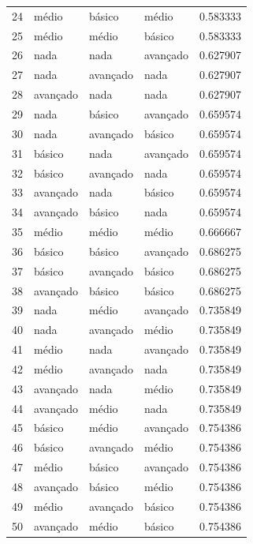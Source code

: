 \documentclass[]{article}
\begin{document}
\begin{longtable}{|llll|r|}
		24 & médio    & básico   & médio    & 0.583333     \\
		25 & médio    & médio    & básico   & 0.583333     \\
		26 & nada      & nada      & avançado & 0.627907     \\
		27 & nada      & avançado & nada      & 0.627907     \\
		28 & avançado & nada      & nada      & 0.627907     \\
		29 & nada      & básico   & avançado & 0.659574     \\
		30 & nada      & avançado & básico   & 0.659574     \\
		31 & básico   & nada      & avançado & 0.659574     \\
		32 & básico   & avançado & nada      & 0.659574     \\
		33 & avançado & nada      & básico   & 0.659574     \\
		34 & avançado & básico   & nada      & 0.659574     \\
		35 & médio    & médio    & médio    & 0.666667     \\
		36 & básico   & básico   & avançado & 0.686275     \\
		37 & básico   & avançado & básico   & 0.686275     \\
		38 & avançado & básico   & básico   & 0.686275     \\
		39 & nada      & médio    & avançado & 0.735849     \\
		40 & nada      & avançado & médio    & 0.735849     \\
		41 & médio    & nada      & avançado & 0.735849     \\
		42 & médio    & avançado & nada      & 0.735849     \\
		43 & avançado & nada      & médio    & 0.735849     \\
		44 & avançado & médio    & nada      & 0.735849     \\
		45 & básico   & médio    & avançado & 0.754386     \\
		46 & básico   & avançado & médio    & 0.754386     \\
		47 & médio    & básico   & avançado & 0.754386     \\
		48 & avançado & básico   & médio    & 0.754386     \\
		49 & médio    & avançado & básico   & 0.754386     \\
		50 & avançado & médio    & básico   & 0.754386     \\

\end{longtable}
\end{document}
